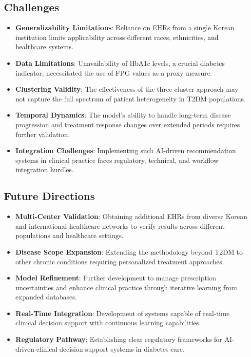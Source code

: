 \subsection*{Challenges}
\begin{itemize}
    \item \textbf{Generalizability Limitations}: Reliance on EHRs from a single Korean institution limits applicability across different races, ethnicities, and healthcare systems.
    \item \textbf{Data Limitations}: Unavailability of HbA1c levels, a crucial diabetes indicator, necessitated the use of FPG values as a proxy measure.
    \item \textbf{Clustering Validity}: The effectiveness of the three-cluster approach may not capture the full spectrum of patient heterogeneity in T2DM populations.
    \item \textbf{Temporal Dynamics}: The model's ability to handle long-term disease progression and treatment response changes over extended periods requires further validation.
    \item \textbf{Integration Challenges}: Implementing such AI-driven recommendation systems in clinical practice faces regulatory, technical, and workflow integration hurdles.
\end{itemize}

\subsection*{Future Directions}
\begin{itemize}
    \item \textbf{Multi-Center Validation}: Obtaining additional EHRs from diverse Korean and international healthcare networks to verify results across different populations and healthcare settings.
    \item \textbf{Disease Scope Expansion}: Extending the methodology beyond T2DM to other chronic conditions requiring personalized treatment approaches.
    \item \textbf{Model Refinement}: Further development to manage prescription uncertainties and enhance clinical practice through iterative learning from expanded databases.
    \item \textbf{Real-Time Integration}: Development of systems capable of real-time clinical decision support with continuous learning capabilities.
    \item \textbf{Regulatory Pathway}: Establishing clear regulatory frameworks for AI-driven clinical decision support systems in diabetes care.
\end{itemize}


